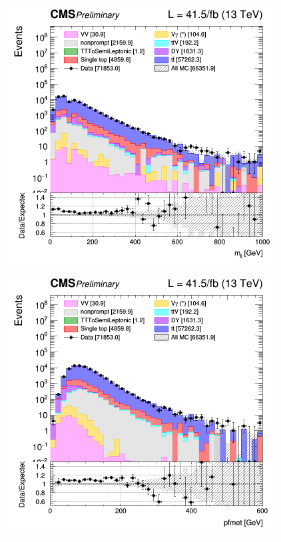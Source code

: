 \documentclass[a4paper, 10pt, openright]{report}
\begin{document}
\begin{figure}[htbp]
{\begin{minipage}[b]{.48\textwidth}
\includegraphics[width=7cm, height=7cm]{figs/log_cratio_ttbarCR_ll_mll_2017.png}
\end{minipage}\hfill
\begin{minipage}[b]{.48\textwidth}
\includegraphics[width=7cm, height=7cm]{figs/log_cratio_ttbarCR_ll_METcorrected_pt_2017.png}
\end{minipage} \hfill
}
\end{figure}
\end{document}
